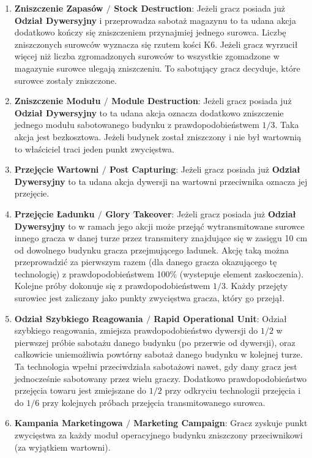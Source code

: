 \documentclass[11pt,a4paper]{article}
\begin{document}
\begin{enumerate}
\item \textbf{Zniszczenie Zapasów $/$ Stock Destruction}: Jeżeli gracz posiada już \textbf{Odział Dywersyjny} i przeprowadza sabotaż magazynu to ta udana akcja dodatkowo kończy się zniszczeniem przynajmiej jednego surowca. Liczbę zniszczonych surowców wyznacza się rzutem kości K6. Jeżeli gracz wyrzucił więcej niż liczba zgromadzonych surowców to wszystkie zgomadzone w magazynie surowce ulegają zniszczeniu. To sabotujący gracz decyduje, które surowce zostały zniszczone.  
\item \textbf{Zniszczenie Modułu $/$ Module Destruction}: Jeżeli gracz posiada już \textbf{Odział Dywersyjny} to ta udana akcja oznacza dodatkowo zniszczenie jednego modułu sabotowanego budynku z prawdopodobieństwem $1/3$. Taka akcja jest bezkosztowa. Jeżeli budynek został zniszczony i nie był wartownią to właściciel traci jeden punkt zwycięstwa.
\item \textbf{Przejęcie Wartowni $/$ Post Capturing}: Jeżeli gracz posiada już \textbf{Odział Dywersyjny} to ta udana akcja dywersji na wartowni przeciwnika oznacza jej przejęcie.
\item \textbf{Przejęcie Ładunku $/$ Glory Takeover}: Jeżeli gracz posiada już \textbf{Odział Dywersyjny} to w ramach jego akcji może przejąć wytransmitowane surowce innego gracza w danej turze przez transmitery znajdujące się w zasięgu 10 cm od dowolnego budynku gracza przejmującego ładunek. Akcję taką można przeprowadzić za pierwszym razem (dla danego gracza okazującego tę technologię) z prawdopodobieństwem 100\% (wystepuje element zaskoczenia). Kolejne próby dokonuje się z prawdopodobieństwem $1/3$. Każdy przejęty surowiec jest zaliczany jako punkty zwycięstwa gracza, który go przejął. 
\item \textbf{Odział Szybkiego Reagowania $/$ Rapid Operational Unit}: Odział szybkiego reagowania, zmiejsza prawdopodobieństwo dywersji do $1/2$ w pierwszej próbie sabotażu danego budynku (po przerwie od dywersji), oraz całkowicie uniemożliwia powtórny sabotaż danego budynku w kolejnej turze. Ta technologia wpełni przeciwdziała sabotażowi nawet, gdy dany gracz jest jednocześnie sabotowany przez wielu graczy. Dodatkowo prawdopodobieństwo przejęcia towaru jest zmiejszane do $1/2$ przy odkryciu technologii przejęcia i do $1/6$ przy kolejnych próbach przejęcia transmitowanego surowca.
\item \textbf{Kampania Marketingowa $/$ Marketing Campaign}: Gracz zyskuje punkt zwycięstwa za każdy moduł operacyjnego budynku zniszczony przeciwnikowi (za wyjątkiem wartowni).
\end{enumerate}
\end{document}
